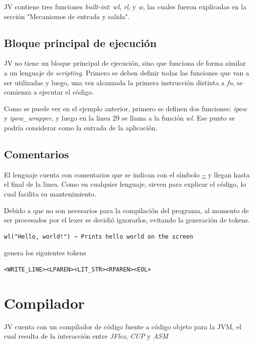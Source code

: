 \documentclass[spanish]{article}
\begin{document}
                \par JV contiene tres funciones \textit{built-int}: \textit{wl}, \textit{rl}, y \textit{w}, las cuales fueron explicadas en la sección "Mecanismos de entrada y salida".

            \subsection{Bloque principal de ejecución}
                \par JV no tiene un bloque principal de ejecución, sino que funciona de forma similar a un lenguaje de \textit{scripting}. Primero se deben definir todas las funciones que van a ser utilizadas y luego, una vez alcanzada la primera instrucción distinta a \textit{fn}, se comienza a ejecutar el código.
                \par Como se puede ver en el ejemplo anterior, primero se definen dos funciones: \textit{ipow} y \textit{ipow\_wrapper}, y luego en la linea 29 se llama a la función \textit{wl}. Ese punto se podría considerar como la entrada de la aplicación. 

            \subsection{Comentarios}
                \par El lenguaje cuenta con comentarios que se indican con el símbolo \url{~} y llegan hasta el final de la linea. Como en cualquier lenguaje, sirven para explicar el código, lo cual facilita su mantenimiento.
                \par Debido a que no son necesarios para la compilación del programa, al momento de ser procesados por el lexer se decidió ignorarlos, evitando la generación de tokens.
                \begin{lstlisting}
wl("Hello, world!") ~ Prints hello world on the screen
                \end{lstlisting} 
                genera los siguientes tokens
                \begin{lstlisting}
<WRITE_LINE><LPAREN><LIT_STR><RPAREN><EOL>
                \end{lstlisting}
        \clearpage

    \section{Compilador}
        \par JV cuenta con un compilador de código fuente a código objeto para la JVM, el cual resulta de la interacción entre \textit{JFlex}, \textit{CUP} y \textit{ASM}
\end{document}
